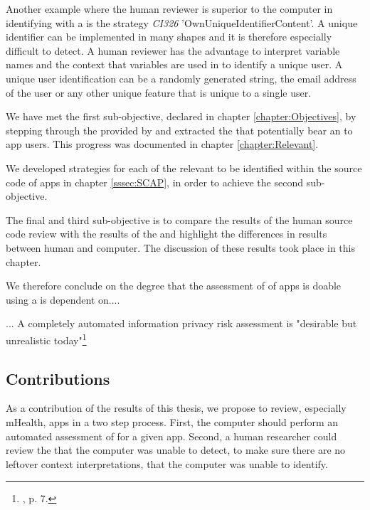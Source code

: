Another example where the human reviewer is superior to the computer in identifying \ipr with a \sca is the strategy \textit{CI326} 'OwnUniqueIdentifierContent'.
A unique identifier can be implemented in many shapes and it is therefore especially difficult to detect.
A human reviewer has the advantage to interpret variable names and the context that variables are used in to identify a unique user.
A unique user identification can be a randomly generated string, the email address of the user or any other unique feature that is unique to a single user.


We have met the first sub-objective, declared in chapter \ref{chapter:Objectives}, by stepping through the \ipp provided by \textcite{Dehling2016} and extracted the \ipp that potentially bear an \ipr to \mH app users.
This progress was documented in chapter \ref{chapter:Relevant}.

We developed strategies for each of the relevant \ipp to be identified within the source code of \mH apps in chapter \ref{sssec:SCAP}, in order to achieve the second sub-objective.

The final and third sub-objective is to compare the results of the human source code review with the results of the \aiprat and highlight the differences in results between human and computer.
The discussion of these results took place in this chapter.

We therefore conclude on the degree that the assessment of \ipr of \mH apps is doable using a \sca is dependent on....

...
A completely automated information privacy risk assessment is "desirable but unrealistic today"\footnote{\cite{Knorr2015}, p. 7.}

\subsection{Contributions}

As a contribution of the results of this thesis, we propose to review, especially mHealth, apps in a two step process.
First, the computer should perform an automated \sca assessment of \ipr for a given app.
Second, a human researcher could review the \ipr that the computer was unable to detect, to make sure there are no leftover context interpretations, that the computer was unable to identify.


